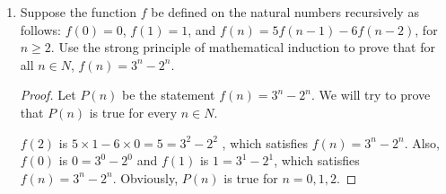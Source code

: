 \documentclass[12pt,a4paper]{article}
\theoremstyle{definition}
\begin{document}
\begin{enumerate}
\begin{proof}
        Since $P(7) = 2 \times 2 + 1 \times 3$, we have $k \ge 8$, and $k-1 \ge 7$.
        
        Since $k$ is the smallest value for which $p(k)$ is false, $P(k-1)$ is true. Thus there exists integers $i_{k-1}\ge 0$ and $j_{k-1}\ge 0$, such that $k-1 = i_{k-1} \times 2 + j_{k-1} \times 3$, and $i_{k-1}$ and $j_{k-1}$ cannot be 0 at the same time.
        
        If $i_{k-1}\ge 1$, we have
        \begin{align*}
            k &= k-1+1 \\
              &= i_{k-1} \times 2 + j_{k-1} \times 3 + 1 \\
              &= i_{k-1} \times 2 + j_{k-1} \times 3 + 3 -2 \\
              &= (i_{k-1}-1) \times 2 + (j_{k-1}+1) \times 3 
        \end{align*}
        
        Let $i_{k}$ be $i_{k-1}-1$ and $j_{k}$ be $j_{k-1}+1$, then $k = i_k \times 2 + j_k \times 3$.
        
        If $j_{k-1}\ge 1$, we have
        \begin{align*}
            k &= k-1+1 \\
              &= i_{k-1} \times 2 + j_{k-1} \times 3 + 1 \\
              &= i_{k-1} \times 2 + j_{k-1} \times 3 + 4 -3 \\
              &= (i_{k-1}+2) \times 2 + (j_{k-1}-1) \times 3 
        \end{align*}
        
        Let $i_{k}$ be $i_{k-1}+2$ and $j_{k}$ be $j_{k-1}-1$, then $k = i_k \times 2 + j_k \times 3$.
        
        We have derived a contradiction, which allows us to conclude that our original assumption is false.
    \end{proof}

    \item
    Suppose the function $f$ be defined on the natural numbers recursively as follows: $f(0)=0$, $f(1)=1$, and $f(n)=5f(n-1)-6f(n-2)$, for $n\geq 2$. Use the strong principle of mathematical induction to prove that for all $n\in N$, $f(n)=3^n-2^n$. 
    \begin{proof}
        Let $P(n)$ be the statement $f(n)=3^n-2^n$. We will try to prove that $P(n)$ is true for every $n\in N$.
        
        $f(2)$ is $5\times 1-6\times 0 = 5 = 3^2 -2^2$ , which satisfies $f(n)=3^n-2^n$. Also, $f(0)$ is $ 0 = 3^0 -2^0$ and $f(1)$ is $ 1 = 3^1 -2^1$, which satisfies $f(n)=3^n-2^n$.
        Obviously, $P(n)$ is true for $n=0,1,2$.
        

\end{proof}
\end{enumerate}
\end{document}

